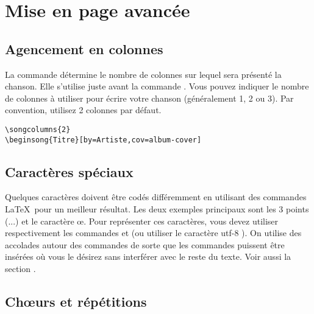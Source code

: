 \documentclass[versionenligne]{framabook}
\begin{document}
\section{Mise en page avancée}

\subsection{Agencement en colonnes}

La commande  détermine le nombre de colonnes sur
lequel sera présenté la chanson. Elle s'utilise juste avant la
commande . Vous pouvez indiquer le nombre de colonnes
à utiliser pour écrire votre chanson (généralement 1, 2 ou 3). Par
convention, utilisez 2 colonnes par défaut.

\begin{verbatim}
\songcolumns{2}
\beginsong{Titre}[by=Artiste,cov=album-cover]
\end{verbatim}

\subsection{Caractères spéciaux}

Quelques caractères doivent être codés différemment en utilisant des
commandes \LaTeX\, pour un meilleur résultat. Les deux exemples
principaux sont les 3 points (...) et le caractère \oe{}. Pour
représenter ces caractères, vous devez utiliser respectivement les
commandes  et  (ou utiliser le
caractère utf-8 ). On utilise des accolades autour des commandes de
sorte que les commandes puissent être insérées où vous le désirez sans
interférer avec le reste du texte. Voir aussi
la section .

\subsection{Ch\oe{}urs et répétitions}
\end{document}
